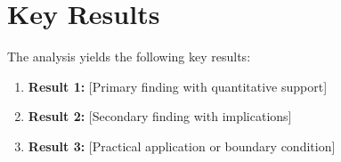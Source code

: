%
%
%
%
%



\section{Key Results}
\label{sec:srl-results}

The analysis yields the following key results:

\begin{enumerate}
    \item \textbf{Result 1:} [Primary finding with quantitative support]
    \item \textbf{Result 2:} [Secondary finding with implications]
    \item \textbf{Result 3:} [Practical application or boundary condition]
\end{enumerate}


